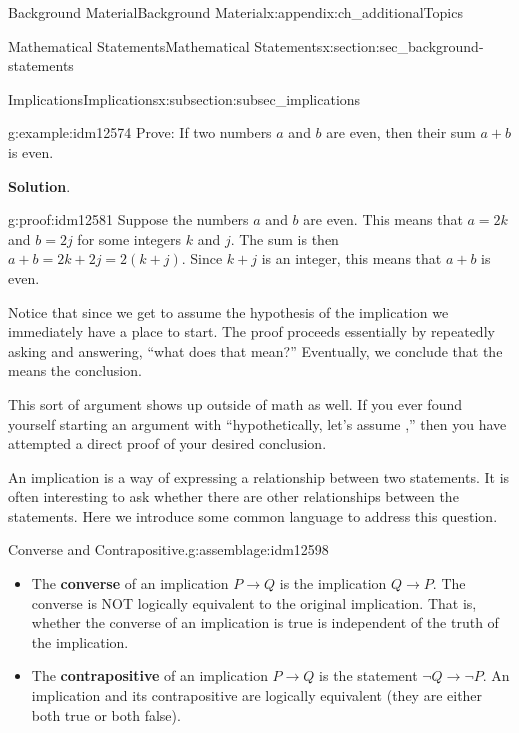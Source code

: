 \documentclass[oneside,10pt,]{book}
\newcommand{\terminology}[1]{\textbf{#1}}
\numberwithin{equation}{chapter}
\def\imp{\rightarrow}
\begin{document}
\begin{appendixptx}{Background Material}{}{Background Material}{}{}{x:appendix:ch_additionalTopics}
\begin{sectionptx}{Mathematical Statements}{}{Mathematical Statements}{}{}{x:section:sec_background-statements}
\begin{subsectionptx}{Implications}{}{Implications}{}{}{x:subsection:subsec_implications}
\begin{example}{}{g:example:idm12574}%
Prove: If two numbers \(a\) and \(b\) are even, then their sum \(a+b\) is even.%
\par\smallskip%
\noindent\textbf{Solution}.\hypertarget{g:solution:idm12580}{}\quad{}\begin{proofptx}{}{g:proof:idm12581}
Suppose the numbers \(a\) and \(b\) are even. This means that  \(a = 2k\) and \(b=2j\) for some integers \(k\) and \(j\). The sum is then \(a+b = 2k+2j = 2(k+j)\). Since \(k+j\) is an integer, this means that \(a+b\) is even.%
\end{proofptx}
Notice that since we get to assume the hypothesis of the implication we immediately have a place to start. The proof proceeds essentially by repeatedly asking and answering, ``what does that mean?''  Eventually, we conclude that the means the conclusion.%
\end{example}
This sort of argument shows up outside of math as well. If you ever found yourself starting an argument with ``hypothetically, let's assume \textellipsis{},'' then you have attempted a direct proof of your desired conclusion.%
\par
An implication is a way of expressing a relationship between two statements.  It is often interesting to ask whether there are other relationships between the statements.  Here we introduce some common language to address this question.%
\begin{assemblage}{Converse and Contrapositive.}{g:assemblage:idm12598}%
%
\begin{itemize}[label=\textbullet]
\item{}The \terminology{converse}  of an implication \(P \imp Q\) is the implication \(Q \imp P\). The converse is NOT logically equivalent to the original implication.  That is, whether the converse of an implication is true is independent of the truth of the implication.%
\item{}The \terminology{contrapositive}  of an implication \(P \imp Q\) is the statement \(\neg Q \imp \neg P\). An implication and its contrapositive are logically equivalent (they are either both true or both false).%
\end{itemize}
%
\end{assemblage}

\end{subsectionptx}
\end{sectionptx}
\end{appendixptx}
\end{document}
